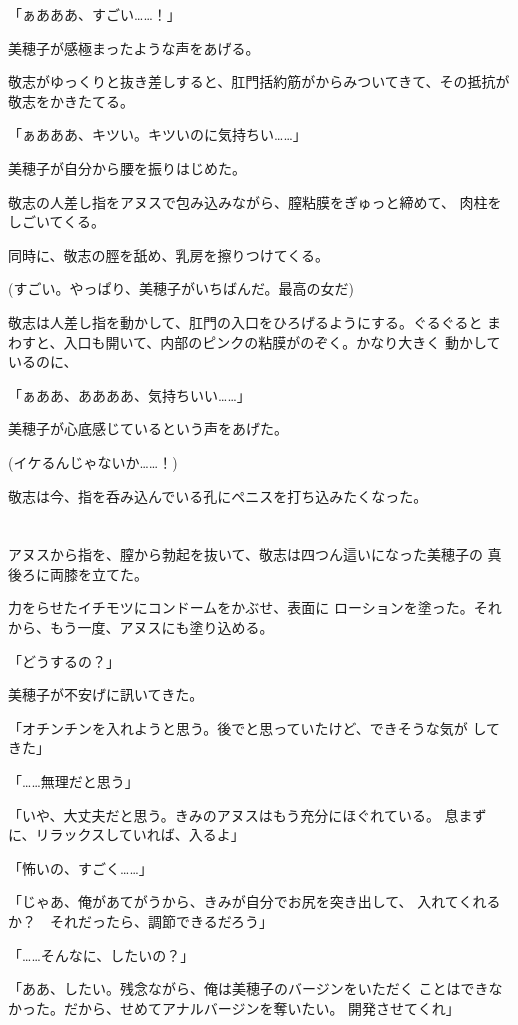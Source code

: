 ﻿\documentclass[
    book,tate,
    line_length=30zw,
    jafontsize=12pt,
    paper=b5j,
    landscape,
    ]{jlreq}
\begin{document}
「ぁあああ、すごい……！」

美穂子が感極まったような声をあげる。

敬志がゆっくりと抜き差しすると、肛門括約筋がからみついてきて、その抵抗が
敬志をかきたてる。

「ぁあああ、キツい。キツいのに気持ちい……」

美穂子が自分から腰を振りはじめた。

敬志の人差し指をアヌスで包み込みながら、膣粘膜をぎゅっと締めて、
肉柱をしごいてくる。

同時に、敬志の脛を舐め、乳房を擦りつけてくる。

(すごい。やっぱり、美穂子がいちばんだ。最高の女だ)

敬志は人差し指を動かして、肛門の入口をひろげるようにする。ぐるぐると
まわすと、入口も開いて、内部のピンクの粘膜がのぞく。かなり大きく
動かしているのに、

「ぁああ、ああああ、気持ちいい……」

美穂子が心底感じているという声をあげた。

(イケるんじゃないか……！)

敬志は今、指を呑み込んでいる孔にペニスを打ち込みたくなった。

\section*{}

アヌスから指を、膣から勃起を抜いて、敬志は四つん這いになった美穂子の
真後ろに両膝を立てた。

力をらせたイチモツにコンドームをかぶせ、表面に
ローションを塗った。それから、もう一度、アヌスにも塗り込める。

「どうするの？」

美穂子が不安げに訊いてきた。

「オチンチンを入れようと思う。後でと思っていたけど、できそうな気が
してきた」

「……無理だと思う」

「いや、大丈夫だと思う。きみのアヌスはもう充分にほぐれている。
息まずに、リラックスしていれば、入るよ」

「怖いの、すごく……」

「じゃあ、俺があてがうから、きみが自分でお尻を突き出して、
入れてくれるか？　それだったら、調節できるだろう」

「……そんなに、したいの？」

「ああ、したい。残念ながら、俺は美穂子のバージンをいただく
ことはできなかった。だから、せめてアナルバージンを奪いたい。
開発させてくれ」
\end{document}

